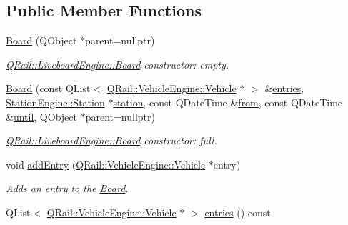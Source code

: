 \subsection*{Public Member Functions}
\begin{DoxyCompactItemize}
\item 
\mbox{\hyperlink{classQRail_1_1LiveboardEngine_1_1Board_a9551cfa04103fadcd7d3ed9771bab947}{Board}} (Q\+Object $\ast$parent=nullptr)
\begin{DoxyCompactList}\small\item\em \mbox{\hyperlink{classQRail_1_1LiveboardEngine_1_1Board}{Q\+Rail\+::\+Liveboard\+Engine\+::\+Board}} constructor\+: empty. \end{DoxyCompactList}\item 
\mbox{\hyperlink{classQRail_1_1LiveboardEngine_1_1Board_a4be1ea3d4ce8b195242b1de059884caa}{Board}} (const Q\+List$<$ \mbox{\hyperlink{classQRail_1_1VehicleEngine_1_1Vehicle}{Q\+Rail\+::\+Vehicle\+Engine\+::\+Vehicle}} $\ast$ $>$ \&\mbox{\hyperlink{classQRail_1_1LiveboardEngine_1_1Board_afbba31f8d0f67e98f9bea58ebcf1e9ac}{entries}}, \mbox{\hyperlink{classQRail_1_1StationEngine_1_1Station}{Station\+Engine\+::\+Station}} $\ast$\mbox{\hyperlink{classQRail_1_1LiveboardEngine_1_1Board_a96964c52def29a72003eb27701cafe12}{station}}, const Q\+Date\+Time \&\mbox{\hyperlink{classQRail_1_1LiveboardEngine_1_1Board_a503aaa8cea63f129e08581a49e308479}{from}}, const Q\+Date\+Time \&\mbox{\hyperlink{classQRail_1_1LiveboardEngine_1_1Board_af09d8cddaaf92ba4a3a5d74ee393388b}{until}}, Q\+Object $\ast$parent=nullptr)
\begin{DoxyCompactList}\small\item\em \mbox{\hyperlink{classQRail_1_1LiveboardEngine_1_1Board}{Q\+Rail\+::\+Liveboard\+Engine\+::\+Board}} constructor\+: full. \end{DoxyCompactList}\item 
void \mbox{\hyperlink{classQRail_1_1LiveboardEngine_1_1Board_ad79d5e4cd527fe02165f1231478b8f8b}{add\+Entry}} (\mbox{\hyperlink{classQRail_1_1VehicleEngine_1_1Vehicle}{Q\+Rail\+::\+Vehicle\+Engine\+::\+Vehicle}} $\ast$entry)
\begin{DoxyCompactList}\small\item\em Adds an entry to the \mbox{\hyperlink{classQRail_1_1LiveboardEngine_1_1Board}{Board}}. \end{DoxyCompactList}\item 
Q\+List$<$ \mbox{\hyperlink{classQRail_1_1VehicleEngine_1_1Vehicle}{Q\+Rail\+::\+Vehicle\+Engine\+::\+Vehicle}} $\ast$ $>$ \mbox{\hyperlink{classQRail_1_1LiveboardEngine_1_1Board_afbba31f8d0f67e98f9bea58ebcf1e9ac}{entries}} () const

\end{DoxyCompactItemize}
